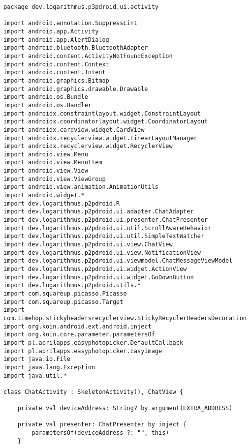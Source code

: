 
\label{sec:source_code}


\begin{lstlisting}
package dev.logarithmus.p3pdroid.ui.activity

import android.annotation.SuppressLint
import android.app.Activity
import android.app.AlertDialog
import android.bluetooth.BluetoothAdapter
import android.content.ActivityNotFoundException
import android.content.Context
import android.content.Intent
import android.graphics.Bitmap
import android.graphics.drawable.Drawable
import android.os.Bundle
import android.os.Handler
import androidx.constraintlayout.widget.ConstraintLayout
import androidx.coordinatorlayout.widget.CoordinatorLayout
import androidx.cardview.widget.CardView
import androidx.recyclerview.widget.LinearLayoutManager
import androidx.recyclerview.widget.RecyclerView
import android.view.Menu
import android.view.MenuItem
import android.view.View
import android.view.ViewGroup
import android.view.animation.AnimationUtils
import android.widget.*
import dev.logarithmus.p2pdroid.R
import dev.logarithmus.p2pdroid.ui.adapter.ChatAdapter
import dev.logarithmus.p2pdroid.ui.presenter.ChatPresenter
import dev.logarithmus.p2pdroid.ui.util.ScrollAwareBehavior
import dev.logarithmus.p2pdroid.ui.util.SimpleTextWatcher
import dev.logarithmus.p2pdroid.ui.view.ChatView
import dev.logarithmus.p2pdroid.ui.view.NotificationView
import dev.logarithmus.p2pdroid.ui.viewmodel.ChatMessageViewModel
import dev.logarithmus.p2pdroid.ui.widget.ActionView
import dev.logarithmus.p2pdroid.ui.widget.GoDownButton
import dev.logarithmus.p2pdroid.utils.*
import com.squareup.picasso.Picasso
import com.squareup.picasso.Target
import com.timehop.stickyheadersrecyclerview.StickyRecyclerHeadersDecoration
import org.koin.android.ext.android.inject
import org.koin.core.parameter.parametersOf
import pl.aprilapps.easyphotopicker.DefaultCallback
import pl.aprilapps.easyphotopicker.EasyImage
import java.io.File
import java.lang.Exception
import java.util.*

class ChatActivity : SkeletonActivity(), ChatView {

    private val deviceAddress: String? by argument(EXTRA_ADDRESS)

    private val presenter: ChatPresenter by inject {
        parametersOf(deviceAddress ?: "", this)
    }


\end{lstlisting}
